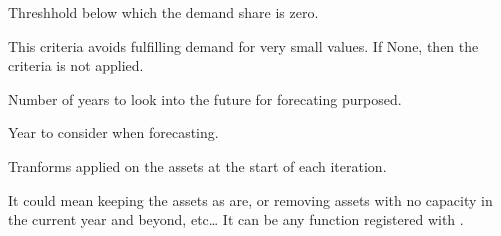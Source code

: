 \documentclass[letterpaper,10pt,english]{sphinxmanual}
\begin{document}
\begin{fulllineitems}
\begin{fulllineitems}
\end{fulllineitems}


\begin{fulllineitems}
\label{\detokenize{api:muse.agents.agent.Agent.demand_threshhold}}
Threshhold below which the demand share is zero.

This criteria avoids fulfilling demand for very small values. If None,
then the criteria is not applied.

\end{fulllineitems}


\begin{fulllineitems}
\label{\detokenize{api:muse.agents.agent.Agent.forecast}}
Number of years to look into the future for forecating purposed.

\end{fulllineitems}


\begin{fulllineitems}
\label{\detokenize{api:muse.agents.agent.Agent.forecast_year}}
Year to consider when forecasting.

\end{fulllineitems}


\begin{fulllineitems}
\label{\detokenize{api:muse.agents.agent.Agent.housekeeping}}
Tranforms applied on the assets at the start of each iteration.

It could mean keeping the assets as are, or removing assets with no
capacity in the current year and beyond, etc…
It can be any function registered with
.


\end{fulllineitems}
\end{fulllineitems}
\end{document}
